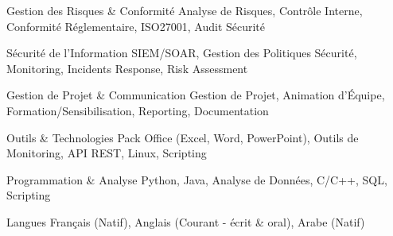 

\begin{cvskills}

  \cvskill
  {Gestion des Risques \& Conformité} %
  {Analyse de Risques, Contrôle Interne, Conformité Réglementaire, ISO27001, Audit Sécurité} %

  \cvskill
  {Sécurité de l'Information} %
  {SIEM/SOAR, Gestion des Politiques Sécurité, Monitoring, Incidents Response, Risk Assessment} %

  \cvskill
  {Gestion de Projet \& Communication} %
  {Gestion de Projet, Animation d'Équipe, Formation/Sensibilisation, Reporting, Documentation} %

  \cvskill
  {Outils \& Technologies} %
  {Pack Office (Excel, Word, PowerPoint), Outils de Monitoring, API REST, Linux, Scripting} %

  \cvskill
  {Programmation \& Analyse} %
  {Python, Java, Analyse de Données, C/C++, SQL, Scripting} %

  \cvskill
  {Langues} %
  {Français (Natif), Anglais (Courant - écrit \& oral), Arabe (Natif)} %

\end{cvskills}
